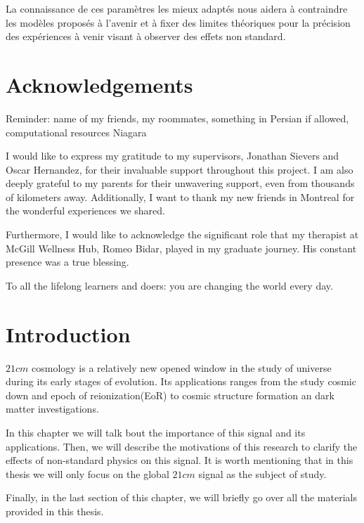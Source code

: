 \documentclass[12pt, TexShade, letterpaper]{report}
\begin{document}
La connaissance de ces paramètres les mieux adaptés nous aidera à contraindre les modèles proposés à l'avenir et à fixer des limites théoriques pour la précision des expériences à venir visant à observer des effets non standard.\par

\chapter*{Acknowledgements}
	\label{chap:acknowledgments}


Reminder: name of my friends, my roommates, something in Persian if allowed, computational resources Niagara \par 
I would like to express my gratitude to my supervisors, Jonathan Sievers and Oscar Hernandez, for their invaluable support throughout this project. I am also deeply grateful to my parents for their unwavering support, even from thousands of kilometers away. Additionally, I want to thank my new friends in Montreal for the wonderful experiences we shared.\par
Furthermore, I would like to acknowledge the significant role that my therapist at McGill Wellness Hub, Romeo Bidar, played in my graduate journey. His constant presence was a true blessing.\par
 To all the lifelong learners and doers: you are changing the world every day.
	\tableofcontents\thispagestyle{plain}

	\listoffigures\thispagestyle{plain}
	\listoftables
	\glsaddall
	\setlength\LTleft{0pt}
	\setlength\LTright{0pt}
	\setlength\glsdescwidth{0.8\hsize}
	\printglossary[title={List of Acronyms}]

 	\clearpage
	
	\glsresetall
\chapter{Introduction}
\label{chap:intro}
$21cm$ cosmology is a relatively new opened window in the study of universe during its early stages of evolution. Its applications ranges from the study cosmic down and epoch of reionization(EoR) to cosmic structure formation an dark matter investigations\cite{SKA_dark_ages}.\par
In this chapter we will talk bout the importance of this signal and its applications. Then, we will describe the motivations of this research to clarify the effects of non-standard physics on this signal. It is worth mentioning that in this thesis we will only focus on the global $21cm$ signal as the subject of study.\par
Finally, in the last section of this chapter, we will briefly go over all the materials provided in this thesis.\par
\end{document}
